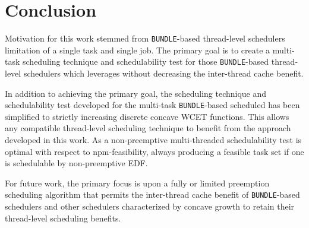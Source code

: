 \section{Conclusion}\label{sec:conclusion}

Motivation for this work stemmed from \texttt{BUNDLE}-based
thread-level schedulers limitation of a single task and single
job. The primary goal is to create a multi-task scheduling technique
and schedulability test for those \texttt{BUNDLE}-based thread-level
schedulers which leverages without decreasing the inter-thread cache
benefit.

In addition to achieving the primary goal, the scheduling technique
and schedulability test developed for the multi-task
\texttt{BUNDLE}-based scheduled has been simplified to strictly
increasing discrete concave WCET functions. This allows any compatible
thread-level scheduling technique to benefit from the \tpj{} approach
developed in this work. As a non-preemptive multi-threaded
schedulability test \tpj{} is optimal with respect to
npm-feasibility, always producing a feasible task set if one is
schedulable by non-preemptive EDF.

For future work, the primary focus is upon a fully or limited preemption
scheduling algorithm that permits the inter-thread cache benefit of
\texttt{BUNDLE}-based schedulers and other schedulers
characterized by concave growth to retain their thread-level
scheduling benefits.
